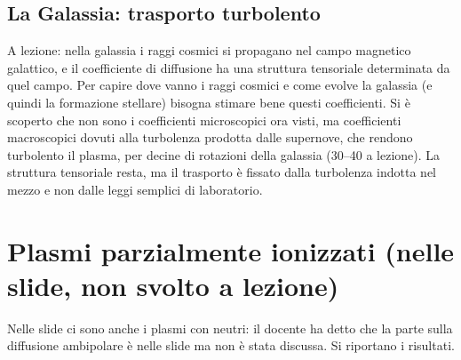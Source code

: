 \subsection{La Galassia: trasporto turbolento}
A lezione: nella galassia i raggi cosmici si propagano nel campo magnetico galattico, e il coefficiente di diffusione ha una struttura tensoriale determinata da quel campo. Per capire dove vanno i raggi cosmici e come evolve la galassia (e quindi la formazione stellare) bisogna stimare bene questi coefficienti. Si è scoperto che non sono i coefficienti microscopici ora visti, ma coefficienti macroscopici dovuti alla turbolenza prodotta dalle supernove, che rendono turbolento il plasma, per decine di rotazioni della galassia (30--40 a lezione). La struttura tensoriale resta, ma il trasporto è fissato dalla turbolenza indotta nel mezzo e non dalle leggi semplici di laboratorio.

\section{Plasmi parzialmente ionizzati (nelle slide, non svolto a lezione)}
Nelle slide ci sono anche i plasmi con neutri: il docente ha detto che la parte sulla diffusione ambipolare è nelle slide ma non è stata discussa. Si riportano i risultati.

